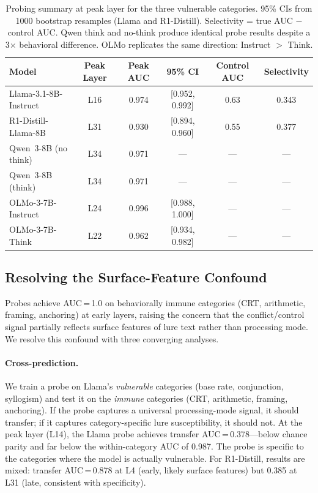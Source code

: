 \documentclass[accepted]{article}
\begin{document}
\begin{table}[t]
\centering
\caption{Probing summary at peak layer for the three
  vulnerable categories.  95\% CIs from 1000 bootstrap resamples
  (Llama and R1-Distill).
  Selectivity = true AUC $-$ control AUC.
  Qwen think and no-think produce identical probe results despite
  a 3$\times$ behavioral difference.  OLMo replicates the same
  direction: Instruct $>$ Think.}
\label{tab:probe_summary}
\vspace{4pt}
\small
\begin{tabular}{lccccc}
\toprule
\textbf{Model} & \textbf{Peak Layer} & \textbf{Peak AUC} & \textbf{95\% CI} & \textbf{Control AUC} & \textbf{Selectivity} \\
\midrule
Llama-3.1-8B-Instruct & L16 & 0.974 & [0.952, 0.992] & 0.63 & 0.343 \\
R1-Distill-Llama-8B   & L31 & 0.930 & [0.894, 0.960] & 0.55 & 0.377 \\
Qwen~3-8B (no think)  & L34 & 0.971 & ---             & ---  & --- \\
Qwen~3-8B (think)     & L34 & 0.971 & ---             & ---  & --- \\
\midrule
OLMo-3-7B-Instruct    & L24 & 0.996 & [0.988, 1.000]  & ---  & --- \\
OLMo-3-7B-Think       & L22 & 0.962 & [0.934, 0.982]  & ---  & --- \\
\bottomrule
\end{tabular}
\end{table}

\subsection{Resolving the Surface-Feature Confound}
\label{sec:specificity}

Probes achieve AUC\,=\,1.0 on behaviorally immune categories (CRT,
arithmetic, framing, anchoring) at early layers, raising the concern
that the conflict/control signal partially reflects surface features of
lure text rather than processing mode.  We resolve this confound with
three converging analyses.

\paragraph{Cross-prediction.}
We train a probe on Llama's \emph{vulnerable} categories (base rate,
conjunction, syllogism) and test it on the \emph{immune} categories
(CRT, arithmetic, framing, anchoring).  If the probe captures a
universal processing-mode signal, it should transfer; if it captures
category-specific lure susceptibility, it should not.  At the peak layer
(L14), the Llama probe achieves transfer AUC\,=\,0.378---below chance
parity and far below the within-category AUC of 0.987.  The probe is
specific to the categories where the model is actually vulnerable.  For
R1-Distill, results are mixed: transfer AUC\,=\,0.878 at L4 (early,
likely surface features) but 0.385 at L31 (late, consistent with
specificity).
\end{document}
